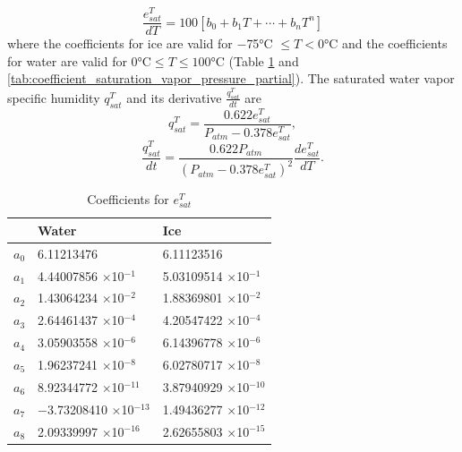 \documentclass[12pt,authoryear]{elsarticle}
\numberwithin{equation}{section} %
\begin{document}
\begin{equation}
\frac{e_{sat}^{T}}{dT} = 100\left[b_{0}+b_{1}T+\cdots+b_{n}T^{n}\right]
\end{equation}
where the coefficients for ice are valid for $-$75°C $\leq T<0$°C and the coefficients for water are valid for 0°C$\leq T \leq100$°C (Table \ref{tab:coefficient_saturation_vapor_pressure} and \ref{tab:coefficient_saturation_vapor_pressure_partial}). The saturated water vapor specific humidity $q_{sat}^{T}$ and its derivative $\frac{q_{sat}^{T}}{dt}$ are
\begin{equation}
q_{sat}^{T}=\frac{0.622e_{sat}^{T}}{P_{atm}-0.378e_{sat}^{T}},
\end{equation}
\begin{equation}
\frac{q_{sat}^{T}}{dt}=\frac{0.622 P_{atm}}{(P_{atm}-0.378e_{sat}^{T})^2}\frac{d e_{sat}^T}{d T}.
\end{equation}

\begin{table}[H]
\centering
\caption{Coefficients for $e_{sat}^{T}$}
\label{tab:coefficient_saturation_vapor_pressure}
\begin{tabular}{p{1cm}p{4.5cm}p{4.5cm}}
\hline
& Water & Ice \\
\hline
$a_{0}$ & 6.11213476 & 6.11123516 \\
$a_{1}$ & 4.44007856 $\times$10$^{-1}$ & 5.03109514 $\times$10$^{-1}$ \\
$a_{2}$ & 1.43064234 $\times$10$^{-2}$ & 1.88369801 $\times$10$^{-2}$ \\
$a_{3}$ & 2.64461437 $\times$10$^{-4}$ & 4.20547422 $\times$10$^{-4}$ \\
$a_{4}$ & 3.05903558 $\times$10$^{-6}$ & 6.14396778 $\times$10$^{-6}$ \\
$a_{5}$ & 1.96237241 $\times$10$^{-8}$ & 6.02780717 $\times$10$^{-8}$ \\
$a_{6}$ & 8.92344772 $\times$10$^{-11}$ & 3.87940929 $\times$10$^{-10}$ \\
$a_{7}$ & $-$3.73208410 $\times$10$^{-13}$ & 1.49436277 $\times$10$^{-12}$ \\
$a_{8}$ & 2.09339997 $\times$10$^{-16}$ & 2.62655803 $\times$10$^{-15}$ \\
\hline
\end{tabular}
\end{table}
\end{document}
